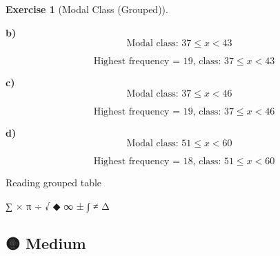 \documentclass[
  letterpaper,
  DIV=11,
  numbers=noendperiod]{scrreprt}
\theoremstyle{definition}
\newtheorem{exercise}{Exercise}[chapter]
\theoremstyle{remark}
\begin{document}
\begin{exercise}[Modal Class
(Grouped)]
\begin{tcolorbox}
\textbf{b)} \[\text{Modal class: }37 \leq x < 43\]

\[\quad \text{Highest frequency = }19\text{, class: }37 \leq x < 43\]

\textbf{c)} \[\text{Modal class: }37 \leq x < 46\]

\[\quad \text{Highest frequency = }19\text{, class: }37 \leq x < 46\]

\textbf{d)} \[\text{Modal class: }51 \leq x < 60\]

\[\quad \text{Highest frequency = }18\text{, class: }51 \leq x < 60\]

\end{tcolorbox}

{Reading grouped table}

\end{exercise}

∑ × π ÷ √ ◆ ∞ ± ∫ ≠ Δ

\subsection{🟡 Medium}
\end{document}
